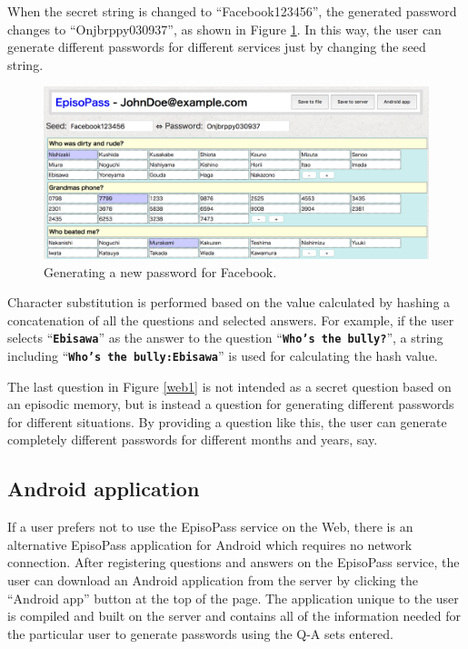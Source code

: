 \documentclass[runningheads,a4paper]{llncs}
\begin{document}
When the secret string is changed to ``\textsf{Facebook123456}'',
the generated password changes to ``\textsf{Onjbrppy030937}'',
as shown in Figure \ref{web2}.
In this way, the user can generate different passwords for
different services just by changing the seed string.

\begin{figure}
  \centering
  \includegraphics[width=1.0\columnwidth]{figures/ab4517dd593c1cabab5fecef546f7e88}
  \caption{Generating a new password for Facebook.}
  \label{web2}
\end{figure}

Character substitution is performed based on the value
calculated by hashing a concatenation of all the questions and selected answers.
%
For example, if the user selects ``\textbf{\texttt{Ebisawa}}''
as the answer to the question ``\textbf{\texttt{Who's the bully?}}'',
a string including ``\textbf{\texttt{Who's the bully:Ebisawa}}''
is used for calculating the hash value.

The last question in Figure \ref{web1} is not intended as a secret question based on an
episodic memory, but is instead a question
for generating different passwords for different situations.
By providing a question like this, the user can generate completely different passwords
for different months and years, say.

\subsection{Android application}


If a user prefers not to use the EpisoPass service on the Web, there
is an alternative EpisoPass application for Android which requires no
network connection.  After registering questions and answers on the
EpisoPass service, the user can download an Android application from
the server by clicking the ``Android app'' button at the top of the
page.  The application unique to the user is compiled and built on the
server and contains all of the information needed for the particular
user to generate passwords using the Q-A sets entered.
\end{document}
